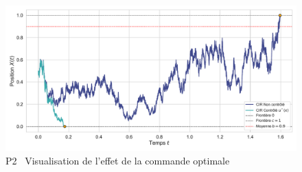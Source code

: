 \begin{figure}[htb]
    \centering
    \includegraphics[width=0.9\linewidth]{img/validation/P2/p2_control_simulation.pdf}
    \caption{P2 \textemdash~Visualisation de l'effet de la commande optimale}
\end{figure}
